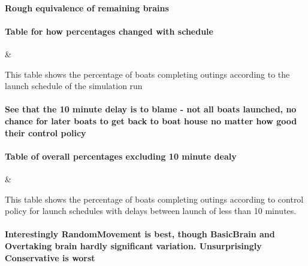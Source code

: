   \paragraph{Rough equivalence of remaining brains}
  
  \paragraph{Table for how percentages changed with schedule}
  \begin{table}[h]
  \centering
  {\name & \landed}
  \caption{This table shows the percentage of boats completing outings according to the launch schedule of the simulation run}
  \label{experiments:tab:returning_boats_by_schedule}
  \end{table}
  
  \paragraph{See that the 10 minute delay is to blame - not all boats launched, no chance for later boats to get back to boat house no matter how good their control policy}
  
  \paragraph{Table of overall percentages excluding 10 minute dealy}
  \begin{table}[h]
  \centering
  {\cp & \landed}
  \caption{This table shows the percentage of boats completing outings according to control policy for launch schedules with delays between launch of less than 10 minutes.}
  \label{experiments:tab:returning_boats_by_policy_small_delay}
  \end{table}
  
  \paragraph{Interestingly RandomMovement is best, though BasicBrain and Overtaking brain hardly significant variation. Unsurprisingly Conservative is worst}
  

